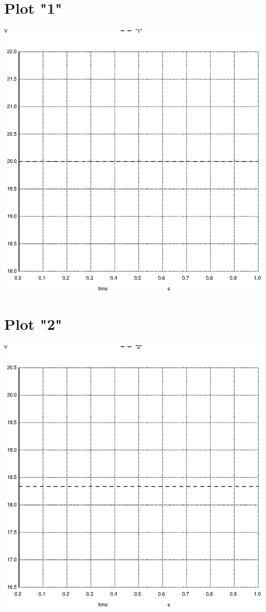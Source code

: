 \documentclass{article}
\begin{document}
\section{Plot "1"}
\includegraphics[scale=0.8]{011.eps}

\section{Plot "2"}
\includegraphics[scale=0.8]{012.eps}
\end{document}
